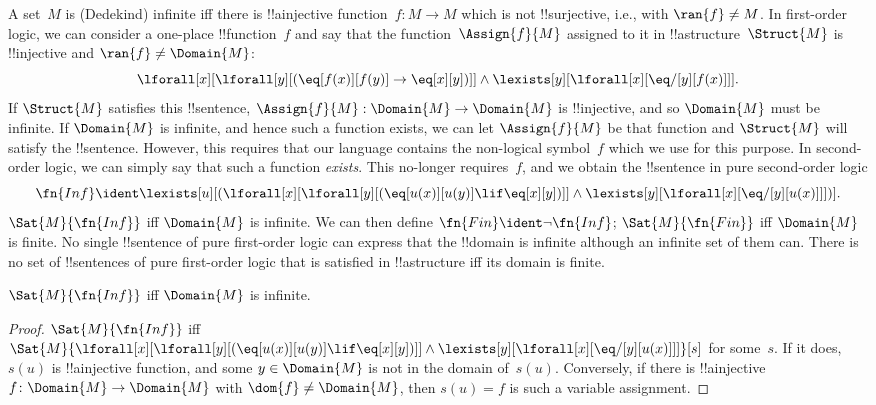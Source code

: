 \documentclass[../../../include/open-logic-section]{subfiles}
\begin{document}


A set~$M$ is (Dedekind) infinite iff there is !!a{injective} function~$f\colon M
\to M$ which is not !!{surjective}, i.e., with $\ran{f} \neq M$. In
first-order logic, we can consider a one-place !!{function}~$f$ and
say that the function~$\Assign{f}{M}$ assigned to it in
!!a{structure}~$\Struct{M}$ is !!{injective} and $\ran{f} \neq
\Domain{M}$:
\[
\lforall[x][\lforall[y][(\eq[f(x)][f(y)] \to \eq[x][y])]] \land
\lexists[y][\lforall[x][\eq/[y][f(x)]]].
\]
If $\Struct{M}$ satisfies this !!{sentence}, $\Assign{f}{M}:
\Domain{M} \to \Domain{M}$ is !!{injective}, and so $\Domain{M}$ must
be infinite. If $\Domain{M}$ is infinite, and hence such a function
exists, we can let $\Assign{f}{M}$ be that function and $\Struct{M}$
will satisfy the !!{sentence}.  However, this requires that our language
contains the non-logical symbol~$f$ which we use for this purpose. In
second-order logic, we can simply say that such a function
\emph{exists}. This no-longer requires~$f$, and we obtain the
!!{sentence} in pure second-order logic
\[
\fn{Inf} \ident \lexists[u][(\lforall[x][\lforall[y][(\eq[u(x)][u(y)]
      \lif \eq[x][y])]] \land \lexists[y][\lforall[x][\eq/[y][u(x)]]])].
\]
$\Sat{M}{\fn{Inf}}$ iff $\Domain{M}$ is infinite.  We can then define
$\fn{Fin} \ident \lnot \fn{Inf}$; $\Sat{M}{\fn{Fin}}$ iff $\Domain{M}$
is finite. No single !!{sentence} of pure first-order logic can
express that the !!{domain} is infinite although an infinite set of
them can. There is no set of !!{sentence}s of pure first-order logic
that is satisfied in !!a{structure} iff its domain is finite.

\begin{prop}
$\Sat{M}{\fn{Inf}}$ iff $\Domain{M}$ is infinite.
\end{prop}

\begin{proof}
$\Sat{M}{\fn{Inf}}$ iff
  $\Sat{M}{\lforall[x][\lforall[y][(\eq[u(x)][u(y)] \lif \eq[x][y])]]
    \land \lexists[y][\lforall[x][\eq/[y][u(x)]]]}[s]$ for
  some~$s$. If it does, $s(u)$ is !!a{injective} function, and some $y
  \in \Domain{M}$ is not in the domain of~$s(u)$. Conversely, if there
  is !!a{injective} $f\colon \Domain{M} \to \Domain{M}$ with $\dom{f}
  \neq \Domain{M}$, then $s(u) = f$ is such a variable
  assignment.
\end{proof}
\end{document}
